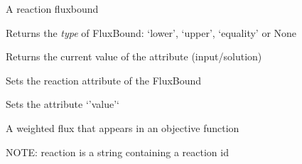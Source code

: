 \documentclass[a4paper,11pt,english]{sphinxmanual}
\begin{document}
\begin{fulllineitems}
\label{modules_doc:cbmpy.CBModel.FluxBound}
A reaction fluxbound

\begin{fulllineitems}
\label{modules_doc:cbmpy.CBModel.FluxBound.getType}
Returns the \emph{type} of FluxBound: `lower', `upper', `equality' or None

\end{fulllineitems}


\begin{fulllineitems}
\label{modules_doc:cbmpy.CBModel.FluxBound.getValue}
Returns the current value of the attribute (input/solution)

\end{fulllineitems}


\begin{fulllineitems}
\label{modules_doc:cbmpy.CBModel.FluxBound.setReactionId}
Sets the reaction attribute of the FluxBound

\end{fulllineitems}


\begin{fulllineitems}
\label{modules_doc:cbmpy.CBModel.FluxBound.setValue}
Sets the attribute `'value'`

\end{fulllineitems}


\end{fulllineitems}


\begin{fulllineitems}
\label{modules_doc:cbmpy.CBModel.FluxObjective}
A weighted flux that appears in an objective function

NOTE: reaction is a string containing a reaction id

\end{fulllineitems}
\end{document}
